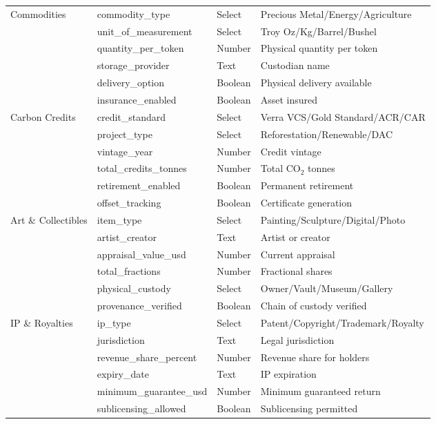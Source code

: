 \documentclass[11pt,a4paper,twoside]{article}
\begin{document}
\begin{longtable}{@{}llll@{}}
\multirow{6}{*}{Commodities}
  & commodity\_type & Select & Precious Metal/Energy/Agriculture \\
  & unit\_of\_measurement & Select & Troy Oz/Kg/Barrel/Bushel \\
  & quantity\_per\_token & Number & Physical quantity per token \\
  & storage\_provider & Text & Custodian name \\
  & delivery\_option & Boolean & Physical delivery available \\
  & insurance\_enabled & Boolean & Asset insured \\
\midrule

\multirow{6}{*}{Carbon Credits}
  & credit\_standard & Select & Verra VCS/Gold Standard/ACR/CAR \\
  & project\_type & Select & Reforestation/Renewable/DAC \\
  & vintage\_year & Number & Credit vintage \\
  & total\_credits\_tonnes & Number & Total CO$_2$ tonnes \\
  & retirement\_enabled & Boolean & Permanent retirement \\
  & offset\_tracking & Boolean & Certificate generation \\
\midrule

\multirow{6}{*}{Art \& Collectibles}
  & item\_type & Select & Painting/Sculpture/Digital/Photo \\
  & artist\_creator & Text & Artist or creator \\
  & appraisal\_value\_usd & Number & Current appraisal \\
  & total\_fractions & Number & Fractional shares \\
  & physical\_custody & Select & Owner/Vault/Museum/Gallery \\
  & provenance\_verified & Boolean & Chain of custody verified \\
\midrule

\multirow{6}{*}{IP \& Royalties}
  & ip\_type & Select & Patent/Copyright/Trademark/Royalty \\
  & jurisdiction & Text & Legal jurisdiction \\
  & revenue\_share\_percent & Number & Revenue share for holders \\
  & expiry\_date & Text & IP expiration \\
  & minimum\_guarantee\_usd & Number & Minimum guaranteed return \\
  & sublicensing\_allowed & Boolean & Sublicensing permitted \\
\midrule


\end{longtable}
\end{document}
